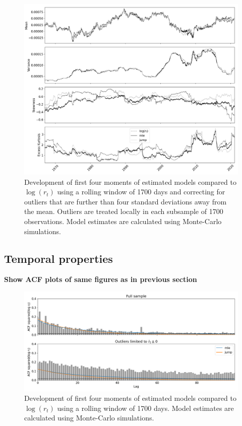 \begin{figure}[H] 
    \centering
    \includegraphics[width=1.0\textwidth]{analysis/stylized_facts/images/rolling_moments_outlier_corrected.png}
    \caption{Development of first four moments of estimated models compared to $\log(r_t)$ using a rolling window of 1700 days and correcting for outliers that are further than four standard deviations away from the mean. Outliers are treated locally in each subsample of 1700 observations. Model estimates are calculated using Monte-Carlo simulations.}
    \label{fig:stylized_facts_rolling_moments_outliers} 
\end{figure}


\subsection{Temporal properties}

\textbf{Show ACF plots of same figures as in previous section}

\begin{figure}[H] 
    \centering
    \includegraphics[width=1.0\textwidth]{analysis/stylized_facts/images/acf_squared_models.png}
    \caption{Development of first four moments of estimated models compared to $\log(r_t)$ using a rolling window of 1700 days. Model estimates are calculated using Monte-Carlo simulations.}
    \label{fig:stylized_facts_acf_plots} 
\end{figure}

